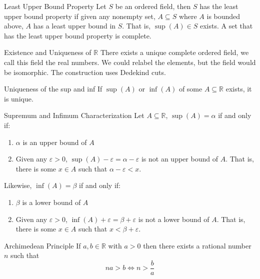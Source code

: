 \documentclass[12pt]{article}
\begin{document}
\begin{definition}{Least Upper Bound Property}{}
    Let $ S $ be an ordered field, then $ S $ has the least upper bound property if given any nonempty set, $ A \subseteq S $ where $ A $ is bounded above, $ A $ has a least upper bound in $ S $. That is, $ \sup(A) \in S $ exists.
    \medskip
    \newline
    A set that has the least upper bound property is complete.
\end{definition}
\begin{theorem}{Existence and Uniqueness of $ \mathbb{R} $}{}
    There exists a unique complete ordered field, we call this field the real numbers.
    \medskip
    \newline
    We could relabel the elements, but the field would be isomorphic. The construction uses Dedekind cuts.
\end{theorem}
\begin{proposition}{Uniqueness of the sup and inf}{}
    If $ \sup(A) $ or $ \inf(A) $ of some $ A \subseteq \mathbb{R} $ exists, it is unique.
\end{proposition}
\begin{theorem}{Supremum and Infimum Characterization}{}
    Let $ A \subseteq \mathbb{R} $, $ \sup(A) = \alpha $ if and only if:
    \begin{enumerate}[label=(\roman*)]
        \item $ \alpha $ is an upper bound of $ A $
        \item Given any $ \varepsilon > 0 $, $ \sup(A) - \varepsilon = \alpha - \varepsilon $ is not an upper bound of $ A $. That is, there is some $ x \in A $ such that $ \alpha - \varepsilon < x $.
    \end{enumerate}
    Likewise, $ \inf(A) = \beta $ if and only if:
    \begin{enumerate}[label=(\roman*)]
        \item $ \beta $ is a lower bound of $ A $
        \item Given any $ \varepsilon > 0 $, $ \inf(A) + \varepsilon = \beta + \varepsilon $ is not a lower bound of $ A $. That is, there is some $ x \in A $ such that $ x < \beta + \varepsilon $.
    \end{enumerate}
\end{theorem}
\begin{lemma}{Archimedean Principle}{}
    If $ a, b \in \mathbb{R} $ with $ a > 0 $ then there exists a rational number $ n $ such that
    \[ na > b \Leftrightarrow n > \frac{b}{a} \]
\end{lemma}
\end{document}
